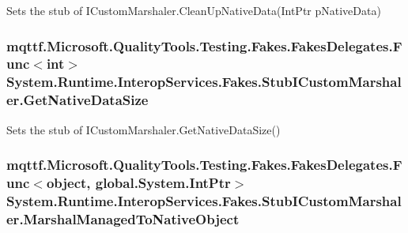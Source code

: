 Sets the stub of I\-Custom\-Marshaler.\-Clean\-Up\-Native\-Data(\-Int\-Ptr p\-Native\-Data)

\hypertarget{class_system_1_1_runtime_1_1_interop_services_1_1_fakes_1_1_stub_i_custom_marshaler_a29e246c8d21832eef44f036620a119ba}{
\subsubsection[{Get\-Native\-Data\-Size}]{\setlength{\rightskip}{0pt plus 5cm}mqttf.\-Microsoft.\-Quality\-Tools.\-Testing.\-Fakes.\-Fakes\-Delegates.\-Func$<$int$>$ System.\-Runtime.\-Interop\-Services.\-Fakes.\-Stub\-I\-Custom\-Marshaler.\-Get\-Native\-Data\-Size}}\label{class_system_1_1_runtime_1_1_interop_services_1_1_fakes_1_1_stub_i_custom_marshaler_a29e246c8d21832eef44f036620a119ba}


Sets the stub of I\-Custom\-Marshaler.\-Get\-Native\-Data\-Size()

\hypertarget{class_system_1_1_runtime_1_1_interop_services_1_1_fakes_1_1_stub_i_custom_marshaler_a889ebc84b40cf6c93f38d2f57e22c1e0}{
\subsubsection[{Marshal\-Managed\-To\-Native\-Object}]{\setlength{\rightskip}{0pt plus 5cm}mqttf.\-Microsoft.\-Quality\-Tools.\-Testing.\-Fakes.\-Fakes\-Delegates.\-Func$<$object, global.\-System.\-Int\-Ptr$>$ System.\-Runtime.\-Interop\-Services.\-Fakes.\-Stub\-I\-Custom\-Marshaler.\-Marshal\-Managed\-To\-Native\-Object}}\label{class_system_1_1_runtime_1_1_interop_services_1_1_fakes_1_1_stub_i_custom_marshaler_a889ebc84b40cf6c93f38d2f57e22c1e0}


